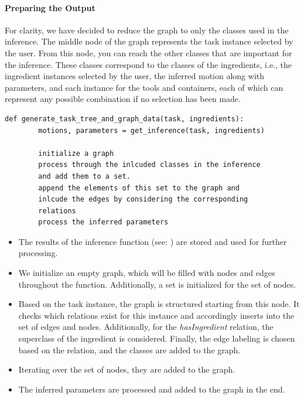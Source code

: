 \paragraph{Preparing the Output}
For clarity, we have decided to reduce the graph to only the classes used in the inference. The middle node of the graph represents the task instance selected by the user. 
From this node, you can reach the other classes that are important for the inference. 
These classes correspond to the classes of the ingredients, i.e., the ingredient instances selected by the user, the inferred motion along with parameters, 
and each instance for the tools and containers, each of which can represent any possible combination if no selection has been made.
\begin{lstlisting}[caption={generating the graph},captionpos=b]
    def generate_task_tree_and_graph_data(task, ingredients):
        motions, parameters = get_inference(task, ingredients)

        initialize a graph
        process through the inlcuded classes in the inference 
        and add them to a set.
        append the elements of this set to the graph and 
        inlcude the edges by considering the corresponding 
        relations
        process the inferred parameters

\end{lstlisting}

\begin{itemize}
    \item The results of the inference function (see: ) are stored and used for further processing.
    \item We initialize an empty graph, which will be filled with nodes and edges throughout the function. Additionally, a set is initialized for the set of nodes.
    \item Based on the task instance, the graph is structured starting from this node. It checks which relations exist for this instance and accordingly inserts into the set of edges and nodes. Additionally, for the \textit{hasIngredient} relation, the superclass of the ingredient is considered. Finally, the edge labeling is chosen based on the relation, and the classes are added to the graph.
    \item Iterating over the set of nodes, they are added to the graph.
    \item The inferred parameters are processed and added to the graph in the end.
\end{itemize}

